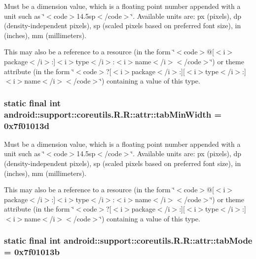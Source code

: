Must be a dimension value, which is a floating point number appended with a unit such as \char`\"{}$<$code$>$14.5sp$<$/code$>$\char`\"{}. Available units are: px (pixels), dp (density-independent pixels), sp (scaled pixels based on preferred font size), in (inches), mm (millimeters). 

This may also be a reference to a resource (in the form \char`\"{}$<$code$>$@\mbox{[}$<$i$>$package$<$/i$>$:\mbox{]}$<$i$>$type$<$/i$>$:$<$i$>$name$<$/i$>$$<$/code$>$\char`\"{}) or theme attribute (in the form \char`\"{}$<$code$>$?\mbox{[}$<$i$>$package$<$/i$>$:\mbox{]}\mbox{[}$<$i$>$type$<$/i$>$:\mbox{]}$<$i$>$name$<$/i$>$$<$/code$>$\char`\"{}) containing a value of this type. \hypertarget{classandroid_1_1support_1_1coreutils_1_1_r_1_1attr_a1bb640a1055c6485ac7b83be072d00f}{
\subsubsection[{tabMinWidth}]{\setlength{\rightskip}{0pt plus 5cm}static final int android::support::coreutils.R.R::attr::tabMinWidth = 0x7f01013d}}
\label{classandroid_1_1support_1_1coreutils_1_1_r_1_1attr_a1bb640a1055c6485ac7b83be072d00f}


Must be a dimension value, which is a floating point number appended with a unit such as \char`\"{}$<$code$>$14.5sp$<$/code$>$\char`\"{}. Available units are: px (pixels), dp (density-independent pixels), sp (scaled pixels based on preferred font size), in (inches), mm (millimeters). 

This may also be a reference to a resource (in the form \char`\"{}$<$code$>$@\mbox{[}$<$i$>$package$<$/i$>$:\mbox{]}$<$i$>$type$<$/i$>$:$<$i$>$name$<$/i$>$$<$/code$>$\char`\"{}) or theme attribute (in the form \char`\"{}$<$code$>$?\mbox{[}$<$i$>$package$<$/i$>$:\mbox{]}\mbox{[}$<$i$>$type$<$/i$>$:\mbox{]}$<$i$>$name$<$/i$>$$<$/code$>$\char`\"{}) containing a value of this type. \hypertarget{classandroid_1_1support_1_1coreutils_1_1_r_1_1attr_550a98049858a613483d1385d502b133}{
\subsubsection[{tabMode}]{\setlength{\rightskip}{0pt plus 5cm}static final int android::support::coreutils.R.R::attr::tabMode = 0x7f01013b}}
\label{classandroid_1_1support_1_1coreutils_1_1_r_1_1attr_550a98049858a613483d1385d502b133}


